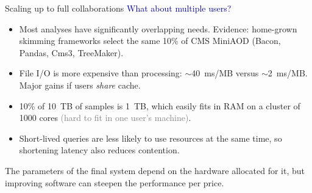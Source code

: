 \documentclass{beamer}
\begin{document}
\begin{frame}{Scaling up to full collaborations}
\vspace{0.4 cm}
\textcolor{darkblue}{What about multiple users?}
\begin{itemize}
\item Most analyses have significantly overlapping needs. Evidence: home-grown skimming frameworks select the same 10\% of CMS MiniAOD (Bacon, Pandas, Cms3, TreeMaker).
\item File I/O is more expensive than processing: $\sim$40~ms/MB versus $\sim$2~ms/MB. Major gains if users {\it share} cache.
\item 10\% of 10~TB of samples is 1~TB, which easily fits in RAM on a cluster of 1000 cores \textcolor{gray}{(hard to fit in one user's machine)}.
\item Short-lived queries are less likely to use resources at the same time, so shortening latency also reduces contention.
\end{itemize}

\vfill
The parameters of the final system depend on the hardware allocated for it, but improving software can steepen the performance per price.
\end{frame}
\end{document}
